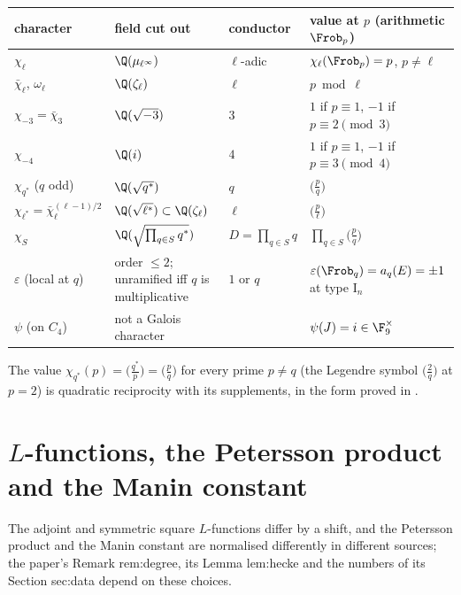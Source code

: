 \begin{center}\small
\begin{tabular}{@{}p{2.6cm}p{4.3cm}p{2.4cm}p{5.2cm}@{}}
\toprule
character & field cut out & conductor & value at $p$ (arithmetic $\Frob_p$)\\
\midrule
$\chi_\ell$ & $\Q(\mu_{\ell^\infty})$ & $\ell$-adic & $\chi_\ell(\Frob_p)=p$, $p\ne\ell$\\
$\bar\chi_\ell$, $\omega_\ell$ & $\Q(\zeta_\ell)$ & $\ell$ & $p\bmod\ell$\\
$\chi_{-3}=\bar\chi_3$ & $\Q(\sqrt{-3})$ & $3$ & $1$ if $p\equiv1$, $-1$ if $p\equiv2\pmod3$\\
$\chi_{-4}$ & $\Q(i)$ & $4$ & $1$ if $p\equiv1$, $-1$ if $p\equiv3\pmod4$\\
$\chi_{q^*}$ ($q$ odd) & $\Q(\sqrt{q^*})$ & $q$ & $\bigl(\frac pq\bigr)$\\
$\chi_{\ell^*}=\bar\chi_\ell^{(\ell-1)/2}$ & $\Q(\sqrt{\ell^*})\subset\Q(\zeta_\ell)$ & $\ell$ & $\bigl(\frac p\ell\bigr)$\\
$\chi_S$ & $\Q(\sqrt{\textstyle\prod_{q\in S}q^*})$ & $D=\prod_{q\in S}q$ & $\prod_{q\in S}\bigl(\frac pq\bigr)$\\
$\varepsilon$ (local at $q$) & order $\le2$; unramified iff $q$ is multiplicative & $1$ or $q$ & $\varepsilon(\Frob_q)=a_q(E)=\pm1$ at type $\mathrm I_n$\\
$\psi$ (on $C_4$) & not a Galois character & & $\psi(J)=i\in\F_9^\times$\\
\bottomrule
\end{tabular}
\end{center}

\noindent The value $\chi_{q^*}(p)=\bigl(\frac{q^*}p\bigr)=\bigl(\frac pq\bigr)$ for every prime $p\ne q$ (the Legendre symbol $\bigl(\frac 2q\bigr)$ at $p=2$) is
quadratic reciprocity with its supplements, in the form proved in .

\section{$L$-functions, the Petersson product and the Manin constant}\label{sec:notation:lfunctions}

The adjoint and symmetric square $L$-functions differ by a shift, and the Petersson product and the Manin constant are
normalised differently in different sources; the paper's Remark rem:degree, its Lemma lem:hecke and the numbers of its
Section sec:data depend on these choices.

